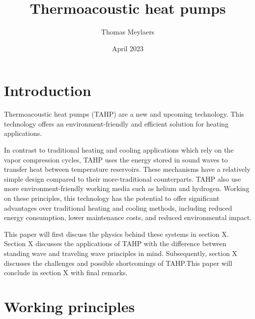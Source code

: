 \documentclass{article}
\title{Thermoacoustic heat pumps}
\author{Thomas Meylaers}
\date{April 2023}
\newcommand{\newpara}
    {
      \bigbreak{}
      \noindent
    }
\begin{document}
\maketitle

\newpage

\begin{abstract}

\end{abstract}

\newpage

\tableofcontents

\newpage


\section{Introduction} %
Thermoacoustic heat pumps (TAHP) are a new and upcoming technology. This technology offers an environment-friendly and efficient solution for heating applications.
\newpara{}
In contrast to traditional heating and cooling applications which rely on the vapor compression cycles, TAHP uses the energy stored in sound waves to transfer heat between temperature reservoirs. These mechanisms have a relatively simple design compared to their more-traditional counterparts. TAHP also use more environment-friendly working media such as helium and hydrogen.
Working on these principles, this technology has the potential to offer significant advantages over traditional heating and cooling methods, including reduced energy consumption, lower maintenance costs, and reduced environmental impact.\cite{powerofsound}
\newpara{}
This paper will first discuss the physics behind these systems in section X. Section X discusses the applications of TAHP with the difference between standing wave and traveling wave principles in mind. Subsequently, section X discusses the challenges and possible shortcomings of TAHP.\@ This paper will conclude in section X with final remarks.

\section{Working principles}
\end{document}
